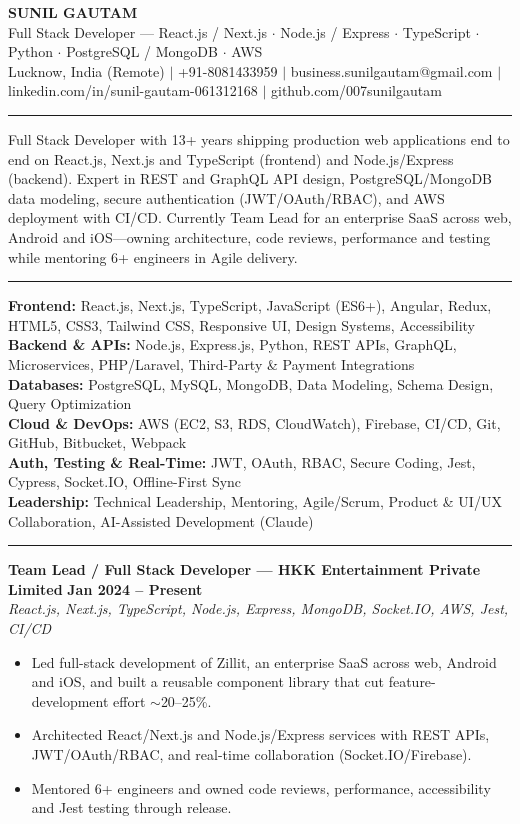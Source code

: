 \documentclass[10pt,a4paper]{article}
\newcommand{\resheading}[1]{\vspace{6pt}{\large\bfseries #1}\vspace{1pt}\hrule\vspace{4pt}}
\newcommand{\entry}[4]{{\bfseries #1} \hfill {\bfseries #2}\\{\itshape #3} \hfill {\itshape #4}\vspace{2pt}}
\begin{document}
\begin{center}
{\LARGE\bfseries SUNIL GAUTAM}\\[3pt]
{\normalsize Full Stack Developer --- React.js / Next.js $\cdot$ Node.js / Express $\cdot$ TypeScript $\cdot$ Python $\cdot$ PostgreSQL / MongoDB $\cdot$ AWS}\\[3pt]
{\small Lucknow, India (Remote) $\mid$ +91-8081433959 $\mid$ business.sunilgautam@gmail.com $\mid$ linkedin.com/in/sunil-gautam-061312168 $\mid$ github.com/007sunilgautam}
\end{center}

\resheading{Professional Summary}
Full Stack Developer with 13+ years shipping production web applications end to end on React.js, Next.js and TypeScript (frontend) and Node.js/Express (backend). Expert in REST and GraphQL API design, PostgreSQL/MongoDB data modeling, secure authentication (JWT/OAuth/RBAC), and AWS deployment with CI/CD. Currently Team Lead for an enterprise SaaS across web, Android and iOS---owning architecture, code reviews, performance and testing while mentoring 6+ engineers in Agile delivery.

\resheading{Technical Skills}
\textbf{Frontend:} React.js, Next.js, TypeScript, JavaScript (ES6+), Angular, Redux, HTML5, CSS3, Tailwind CSS, Responsive UI, Design Systems, Accessibility\\
\textbf{Backend \& APIs:} Node.js, Express.js, Python, REST APIs, GraphQL, Microservices, PHP/Laravel, Third-Party \& Payment Integrations\\
\textbf{Databases:} PostgreSQL, MySQL, MongoDB, Data Modeling, Schema Design, Query Optimization\\
\textbf{Cloud \& DevOps:} AWS (EC2, S3, RDS, CloudWatch), Firebase, CI/CD, Git, GitHub, Bitbucket, Webpack\\
\textbf{Auth, Testing \& Real-Time:} JWT, OAuth, RBAC, Secure Coding, Jest, Cypress, Socket.IO, Offline-First Sync\\
\textbf{Leadership:} Technical Leadership, Mentoring, Agile/Scrum, Product \& UI/UX Collaboration, AI-Assisted Development (Claude)

\resheading{Professional Experience}
\entry{Team Lead / Full Stack Developer --- HKK Entertainment Private Limited}{Jan 2024 -- Present}{React.js, Next.js, TypeScript, Node.js, Express, MongoDB, Socket.IO, AWS, Jest, CI/CD}{}
\begin{itemize}
  \item Led full-stack development of Zillit, an enterprise SaaS across web, Android and iOS, and built a reusable component library that cut feature-development effort $\sim$20--25\%.
  \item Architected React/Next.js and Node.js/Express services with REST APIs, JWT/OAuth/RBAC, and real-time collaboration (Socket.IO/Firebase).
  \item Mentored 6+ engineers and owned code reviews, performance, accessibility and Jest testing through release.
\end{itemize}
\end{document}
